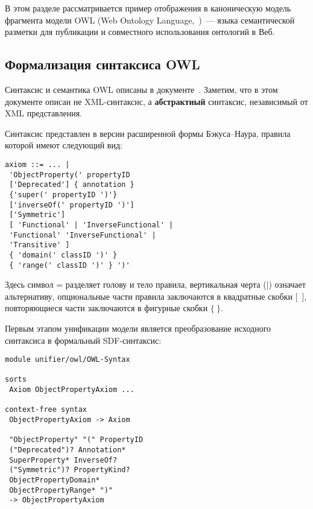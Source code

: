 \begin{multicols}{2}
В этом разделе рассматривается пример отображения в каноническую модель
фрагмента модели OWL (Web Ontology Language,~\cite{owlref})~--- языка
семантической разметки для публикации и совместного использования онтологий в Веб.

\subsection{Формализация синтаксиса OWL}

Синтаксис и семантика OWL описаны в документе~\cite{owlsem}.
Заметим, что в этом документе описан не XML-синтаксис, а \textbf{абстрактный}
синтаксис, независимый от XML представления.

Синтаксис представлен в версии расширенной формы Бэкуса--Наура,
правила которой имеют следующий вид:


\noindent
{\small
\begin{verbatim}
axiom ::= ... |
 'ObjectProperty(' propertyID 
 ['Deprecated'] { annotation } 
 {'super(' propertyID ')'} 
 ['inverseOf(' propertyID ')']
 ['Symmetric']
 [ 'Functional' | 'InverseFunctional' | 
 'Functional' 'InverseFunctional' | 
 'Transitive' ]
 { 'domain(' classID ')' } 
 { 'range(' classID ')' } ')'
\end{verbatim}
}


\noindent
Здесь символ {\verb ::= } разделяет голову и тело правила,
вертикальная черта ($\vert$) означает альтернативу, опциональные части
правила заключаются в квад\-рат\-ные скобки [\ ], повторяющиеся части
заключаются в фигурные скобки $\{\ \}$.

Первым этапом унификации модели является преобразование
исходного синтаксиса в формальный SDF-синтаксис:


\noindent
{\small
\begin{verbatim}
module unifier/owl/OWL-Syntax

sorts
 Axiom ObjectPropertyAxiom ...

context-free syntax
 ObjectPropertyAxiom -> Axiom

 "ObjectProperty" "(" PropertyID 
 ("Deprecated")? Annotation*
 SuperProperty* InverseOf? 
 ("Symmetric")? PropertyKind?
 ObjectPropertyDomain* 
 ObjectPropertyRange* ")"
 -> ObjectPropertyAxiom


\end{verbatim}}
\end{multicols}
